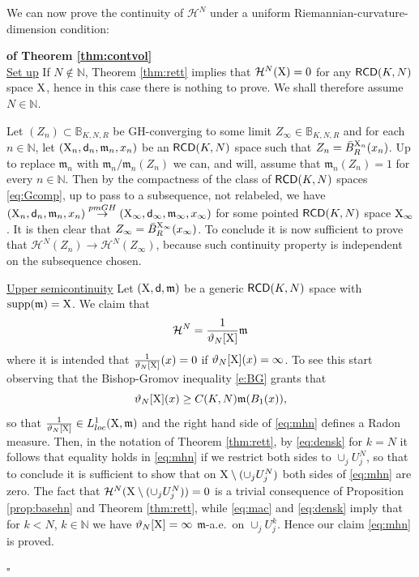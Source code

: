\documentclass[reqno,11pt]{article}
\numberwithin{equation}{section}
\newcommand{\N}{\mathbb{N}}
\newcommand{\mm}{{\mbox{\boldmath$m$}}}
\newcommand{\sfd}{{\sf d}}
\newcommand{\supp}{\mathop{\rm supp}\nolimits}   %
\renewcommand{\mm}{\mathfrak m}                                %
\newenvironment{proofb}{\removelastskip\par\medskip   %
\noindent{\em{\bf Proof}} \rm}{\penalty-20\null\hfill$\square$\par\medbreak}
\newcommand{\X}{{\rm X}}
\newcommand{\RCD}{{\sf RCD}}
\newcommand{\HH}{{\mathcal H}}
\begin{document}
We can now prove the continuity of $\HH^N$ under a uniform Riemannian-curvature-dimension condition:
\begin{proofb}{\bf of Theorem \ref{thm:contvol}}\\
\noindent\underline{Set up}  If $N\notin\N$, Theorem \ref{thm:rett} implies that $\HH^N(\X)=0$ for any $\RCD(K,N)$ space $\X$, hence in this case there is nothing to prove. We shall therefore assume $N\in\N$.

 Let $(Z_n)\subset\mathbb B_{K,N,R}$ be GH-converging to some limit $Z_\infty\in{\mathbb B}_{K,N,R}$ and for each $n\in\N$, let $(\X_n,\sfd_n,\mm_n,x_n)$ be an $\RCD(K,N)$ space such that $Z_n=\bar B^{\X_n}_R(x_n)$. Up to replace $\mm_n$ with $\mm_n/\mm_n(Z_n)$ we can, and will, assume that $\mm_n(Z_n)=1$ for every $n\in\N$. Then by the compactness of the class of $\RCD(K,N)$ spaces \eqref{eq:Gcomp}, up to pass to a subsequence, not relabeled, we  have  $(\X_n,\sfd_n,\mm_n,x_n)\stackrel{pmGH}\to (\X_\infty,\sfd_\infty,\mm_\infty,x_\infty)$ for some pointed $\RCD(K,N)$  space $\X_\infty$. It is then clear  that $Z_\infty=\bar B_R^{\X_\infty}(x_\infty)$. To conclude it is now sufficient to prove that $\HH^N(Z_n)\to\HH^N(Z_\infty)$, because such continuity property is independent on the subsequence chosen. 

\noindent\underline{Upper semicontinuity} Let $(\X,\sfd,\mm)$ be a generic  $\RCD(K,N)$ space  with $\supp(\mm)=\X$. We claim that
\begin{equation}
\label{eq:mhn}
\HH^N=\frac1{\vartheta_N[\X]}\mm
\end{equation}
where it is intended that $\frac1{\vartheta_N[\X]}(x)=0$ if $\vartheta_N[\X](x)=\infty$. To see this start observing that the Bishop-Gromov inequality \eqref{e:BG} grants that 
\begin{equation}
\label{eq:bbasso}
\vartheta_N[\X](x)\geq C(K, N) \mm(B_1(x)),
\end{equation}
so that $\frac1{\vartheta_N[\X]}\in L^1_{loc}(\X,\mm)$ and the right hand side of \eqref{eq:mhn} defines a Radon measure. Then, in the notation of Theorem \ref{thm:rett}, by \eqref{eq:densk} for $k=N$ it follows that equality holds in \eqref{eq:mhn} if we restrict both sides to $\cup_jU^N_j$, so that to conclude it is sufficient to show that on  $\X\setminus (\cup_jU^N_j)$ both sides of \eqref{eq:mhn} are zero. The fact that $\HH^N(\X\setminus (\cup_jU^N_j))=0$ is a trivial consequence of Proposition \ref{prop:basehn} and Theorem \ref{thm:rett}, while \eqref{eq:mac} and \eqref{eq:densk} imply that for $k<N$, $k\in\N$ we have $\vartheta_N[\X]=\infty$ $\mm$-a.e.\ on $\cup_jU_j^k$. Hence our claim \eqref{eq:mhn} is proved.


\end{proofb}
\end{document}
